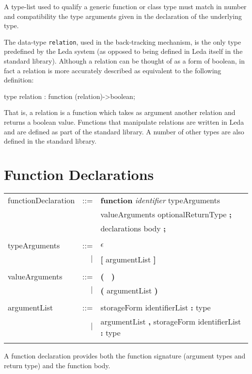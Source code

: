 A type-list used to qualify a generic function or class type
must match in number and compatibility the type arguments given
in the declaration of the underlying type.

The data-type {\tt relation}, used in the back-tracking mechanism, is
the only type predefined by the Leda system (as opposed to being defined in
Leda itself in the standard library).  Although a relation can be
thought of as a form of boolean, in fact a relation is more accurately
described as equivalent to the following definition:
\begin{cprog}

type
	relation : function (relation)->boolean;

\end{cprog}
That is, a relation is a function which takes as argument another relation
and returns a boolean value.   Functions that manipulate relations
are written in Leda and are defined as part of the standard library.
A number of other types are also defined in the standard library.

\section{Function Declarations}\label{gr4}

\begin{tabular}{l r l}
functionDeclaration & ::= & {\bf function} {\em identifier} typeArguments \\
& & valueArguments optionalReturnType {\bf ;} \\
& & declarations body {\bf ;} \\ \\
typeArguments & ::= & $\epsilon$ \\
& $\mid$ & {\bf [} argumentList {\bf ]} \\ \\
valueArguments & ::= & {\bf (} $\;$ {\bf )} \\
& $\mid$ & {\bf (} argumentList {\bf )} \\ \\
argumentList & ::= & storageForm identifierList {\bf :} type \\
& $\mid$ & argumentList {\bf ,} storageForm identifierList {\bf :} type \\ \\
\end{tabular}

A function declaration provides both the function signature (argument
types and return type) and the function body.


